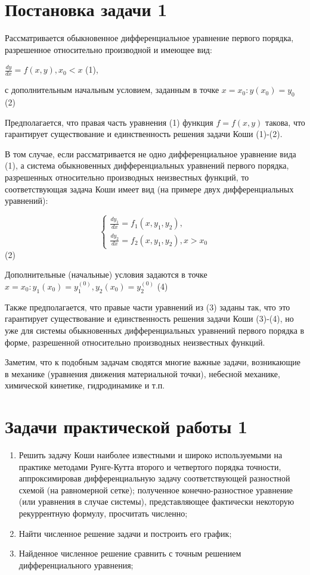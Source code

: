\documentclass[a4paper,12pt,titlepage,finall]{article}
\begin{document}
\section{Постановка задачи 1}

Рассматривается обыкновенное дифференциальное уравнение первого порядка, разрешенное относительно производной и имеющее вид:

$\frac{dy}{dx} = f(x, y), x_{0} < x$ (1),

с дополнительным начальным условием, заданным в точке $x = x_{0} : y(x_{0}) = y_{0}$ (2)

Предполагается, что правая часть уравнения (1) функция $f = f(x, y)$ такова, что гарантирует существование и единственность решения задачи Коши (1)-(2).

В том случае, если рассматривается не одно дифференциальное уравнение вида (1), а система обыкновенных дифференциальных уравнений первого порядка, разрешенных относительно производных неизвестных функций, то соответствующая задача Коши имеет вид (на примере двух дифференциальных уравнений):

\begin{equation*}
 \begin{cases}
   \frac{dy_{1}}{dx} = f_{1}(x, y_{1}, y_{2}),
   \\
   \frac{dy_{2}}{dx} = f_{2}(x, y_{1}, y_{2}), x > x_{0}
 \end{cases}
\end{equation*} (2)

Дополнительные (начальные) условия задаются в точке $x = x_{0} : y_{1}(x_{0}) = y_{1}^{(0)}, y_{2}(x_{0}) = y_{2}^{(0)}$ (4)

Также предполагается, что правые части уравнений из (3) заданы так, что это гарантирует существование и единственность решения задачи Коши (3)-(4), но уже для системы обыкновенных дифференциальных уравнений первого порядка в форме, разрешенной относительно производных неизвестных функций.

Заметим, что к подобным задачам сводятся многие важные задачи, возникающие в механике (уравнения движения материальной точки), небесной механике, химической кинетике, гидродинамике и т.п.

\section{Задачи практической работы 1}
\begin{enumerate}
\item Решить задачу Коши наиболее известными и широко используемыми на практике методами Рунге-Кутта второго и четвертого порядка точности, аппроксимировав дифференциальную задачу соответствующей разностной схемой (на равномерной сетке); полученное конечно-разностное уравнение (или уравнения в случае системы), представляющее фактически некоторую рекуррентную формулу, просчитать численно;
\item Найти численное решение задачи и построить его график;
\item Найденное численное решение сравнить с точным решением дифференциального уравнения;

\end{enumerate}
\end{document}
